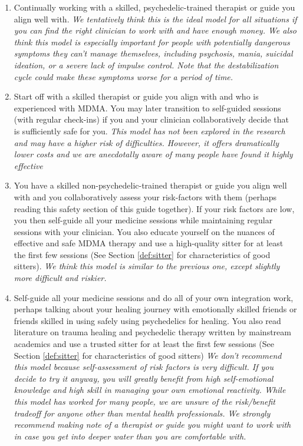 \documentclass[12pt,letterpaper]{article}
\begin{document}
\begin{enumerate}
    \item Continually working with a skilled, psychedelic-trained therapist or guide you align well with. \textit{We tentatively think this is the ideal model for all situations if you can find the right clinician to work with and have enough money. We also think this model is especially important for people with potentially dangerous symptoms they can't manage themselves, including psychosis, mania, suicidal ideation, or a severe lack of impulse control. Note that the destabilization cycle could make these symptoms worse for a period of time.}
    \item Start off with a skilled therapist or guide you align with and who is experienced with MDMA. You may later transition to self-guided sessions (with regular check-ins) if you and your clinician collaboratively decide that is sufficiently safe for you. \textit{This model has not been explored in the research and may have a higher risk of difficulties. However, it offers dramatically lower costs and we are anecdotally aware of many people have found it highly effective}
    \item You have a skilled non-psychedelic-trained therapist or guide you align well with and you collaboratively assess your risk-factors with them (perhaps reading this safety section of this guide together). If your risk factors are low, you then self-guide all your medicine sessions while maintaining regular sessions with your clinician. You also educate yourself on the nuances of effective and safe MDMA therapy and use a high-quality sitter for at least the first few sessions (See Section \ref{def:sitter} for characteristics of good sitters). \textit{We think this model is similar to the previous one, except slightly more difficult and riskier.}
    \item Self-guide all your medicine sessions and do all of your own integration work, perhaps talking about your healing journey with emotionally skilled friends or friends skilled in using safely using psychedelics for healing. You also read literature on trauma healing and psychedelic therapy written by mainstream academics and use a trusted sitter for at least the first few sessions (See Section \ref{def:sitter} for characteristics of good sitters) \textit{We don't recommend this model because self-assessment of risk factors is very difficult. If you decide to try it anyway, you will greatly benefit from high self-emotional knowledge and high skill in managing your own emotional reactivity. While this model has worked for many people, we are unsure of the risk/benefit tradeoff for anyone other than mental health professionals. We strongly recommend making note of a therapist or guide you might want to work with in case you get into deeper water than you are comfortable with.} 

\end{enumerate}
\end{document}
